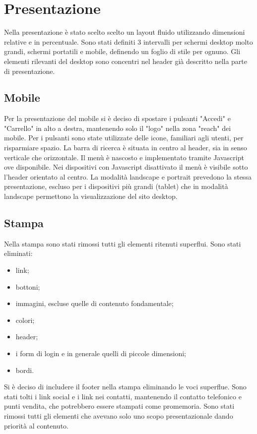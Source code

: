 \section{Presentazione}
Nella presentazione è stato scelto scelto un layout fluido utilizzando dimensioni relative e in percentuale.
Sono stati definiti 3 intervalli per schermi desktop molto grandi, schermi portatili e mobile, definendo un foglio di stile per ognuno.
Gli elementi rilevanti del desktop sono concentri nel header già descritto nella parte di presentazione.
\subsection{Mobile}
Per la presentazione del mobile si è deciso di spostare i pulsanti "Accedi" e "Carrello" in alto a destra, mantenendo solo il "logo" nella zona "reach" dei mobile. Per i pulsanti sono state utilizzate delle icone, familiari agli utenti, per risparmiare spazio. La barra di ricerca è situata in centro al header, sia in senso verticale che orizzontale. Il menù è nascosto e implementato tramite Javascript ove disponibile. Nei dispositivi con Javascript disattivato il menù è visibile sotto l'header orientato al centro. 
La modalità landscape e portrait prevedono la stessa presentazione, escluso per i dispositivi più grandi (tablet) che in modalità landscape permettono la visualizzazione del sito desktop.
\subsection{Stampa}
Nella stampa sono stati rimossi tutti gli elementi ritenuti superflui. Sono stati eliminati: 
\begin{itemize}
    \item link;
    \item bottoni;
    \item immagini, escluse quelle di contenuto fondamentale;
    \item colori;
    \item header;
    \item i form di login e in generale quelli di piccole dimensioni;
    \item bordi.
\end{itemize}
Si è deciso di includere il footer nella stampa eliminando le voci superflue. Sono stati tolti i link social e i link nei contatti, mantenendo il contatto telefonico e punti vendita, che potrebbero essere stampati come promemoria. 
Sono stati rimossi tutti gli elementi che avevano solo uno scopo presentazionale dando priorità al contenuto.